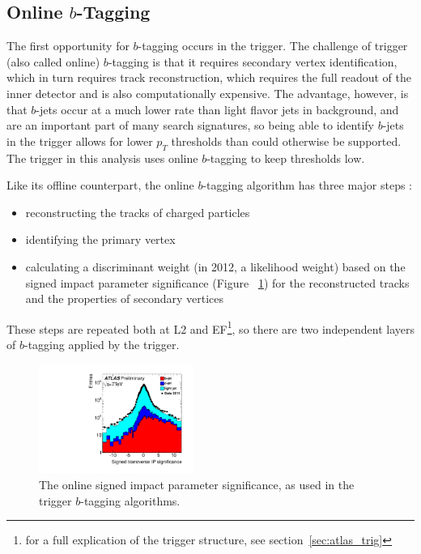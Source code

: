 \subsection{Online $b$-Tagging}
\label{sec:online_btagging}
The first opportunity for $b$-tagging occurs in the trigger.  The challenge of trigger (also called online)
$b$-tagging is that it requires secondary vertex identification, which in turn requires track reconstruction,
which requires the full readout of the inner detector and is also computationally expensive.  The advantage,
however, is that $b$-jets occur at a much lower rate than light flavor jets in background, and are an important
part of many search signatures, so being able to identify $b$-jets in the trigger allows for lower $p_T$
thresholds than could otherwise be supported.  The trigger in this analysis uses online $b$-tagging to keep
thresholds low. 

Like its offline counterpart, the online $b$-tagging algorithm has three major steps \cite{online_btag_2}:
\begin{itemize}
    \item reconstructing the tracks of charged particles
    \item identifying the primary vertex
    \item calculating a discriminant weight (in 2012, a likelihood weight) based on the signed impact parameter significance 
    (Figure ~\ref{fig:ip_sig}) for the reconstructed tracks and the properties of secondary vertices
\end{itemize}

These steps are repeated both at L2 and EF\footnote{for a full explication of the trigger structure,
see section~\ref{sec:atlas_trig}}, so there are two independent layers of $b$-tagging applied by the
trigger.

\begin{figure}
    \center
   \includegraphics[width=0.45\textwidth]{ReconstructionPerformance/online_btag_IP.pdf}
   \caption{The online signed impact parameter significance, as used in the trigger $b$-tagging algorithms. \label{fig:ip_sig} }
\end{figure}


